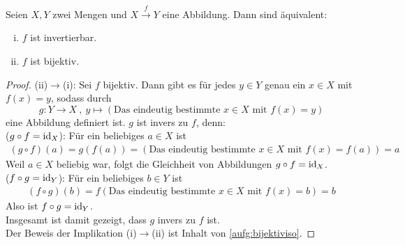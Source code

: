 \begin{satz} \label{bijektiviso}
    Seien $X,Y$ zwei Mengen und $X\xrightarrow{f} Y$ eine Abbildung. Dann sind äquivalent:
    \begin{enumerate}[(i)]
        \item $f$ ist invertierbar.
        \item $f$ ist bijektiv.
    \end{enumerate}
\end{satz}
\begin{proof}
    (ii)$\to$(i): Sei $f$ bijektiv. Dann gibt es für jedes $y\in Y$ genau ein $x\in X$ mit $f(x)=y$, sodass durch
        \[ g : Y\to X \ ,\ y \mapsto (\text{Das eindeutig bestimmte $x\in X$ mit $f(x)=y$}) \]
    eine Abbildung definiert ist. $g$ ist invers zu $f$, denn: \\[0.5em]
    ($g\circ f=\mathrm{id}_X$): Für ein beliebiges $a\in X$ ist
    \begin{align*}
        (g\circ f)(a) = g(f(a)) = (\text{Das eindeutig bestimmte $x\in X$ mit $f(x)=f(a)$}) = a
    \end{align*}
    Weil $a\in X$ beliebig war, folgt die Gleichheit von Abbildungen $g\circ f=\mathrm{id}_X$. \\[0.5em]
    ($f\circ g=\mathrm{id}_Y$): Für ein beliebiges $b\in Y$ ist
    \begin{align*}
        (f\circ g)(b) = f(\text{Das eindeutig bestimmte $x\in X$ mit $f(x)=b$}) = b
    \end{align*}
    Also ist $f\circ g=\mathrm{id}_Y$. \\[0.5em]
    Insgesamt ist damit gezeigt, dass $g$ invers zu $f$ ist. \\[0.5em]
    Der Beweis der Implikation (i)$\to$(ii) ist Inhalt von \cref{aufg:bijektiviso}.
\end{proof}


